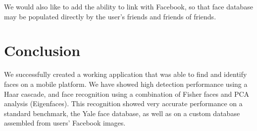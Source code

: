 We would also like to add the ability to link with Facebook, so that
face database may be populated directly by the user's friends and
friends of friends.



\section{Conclusion}

We successfully created a working application that was able to find
and identify faces on a mobile platform.  We have showed high
detection performance using a Haar cascade, and face recognition using
a combination of Fisher faces and PCA analysis (Eigenfaces).  This
recognition showed very accurate performance on a standard benchmark,
the Yale face database, as well as on a custom database assembled from
users' Facebook images.
